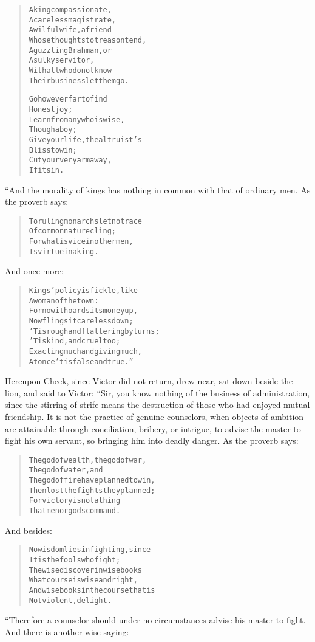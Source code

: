 \documentclass[article, twoside, 14pt]{memoir}
\renewenvironment{verbatim}{%
\begin{quote}%
\vskip -10pt%
\begin{alltt}\normalfont\large}{\end{alltt}%
\end{quote}%
\vskip -10pt
} %
\begin{document}
\begin{verbatim}
A king compassionate,
A careless magistrate,
A wilful wife, a friend
Whose thoughts to treason tend,
A guzzling Brahman, or
A sulky servitor,
With all who do not know
Their business{\textemdash}let them go.

Go however far to find
    Honest joy;
Learn from any who is wise,
    Though a boy;
Give your life, the altruist's
    Bliss to win;
Cut your very arm away,
    If it sin.
\end{verbatim}
“And the morality of kings has nothing in common with that of
ordinary men. As the proverb says:

\begin{verbatim}
To ruling monarchs let no trace
    Of common nature cling;
For what is vice in other men,
    Is virtue in a king.
\end{verbatim}
And once more:

\begin{verbatim}
Kings' policy is fickle, like
    A woman of the town:
For now it hoards its money up,
    Now flings it careless down;
'Tis rough and flattering by turns;
    'Tis kind, and cruel too;
Exacting much and giving much,
    At once 'tis false and true.”
\end{verbatim}
Hereupon Cheek, since Victor did not return, drew near, sat down
beside the lion, and said to Victor: “Sir, you know nothing of the
business of administration, since the stirring of strife means the
destruction of those who had enjoyed mutual friendship. It is not
the practice of genuine counselors, when objects of ambition are
attainable through conciliation, bribery, or intrigue, to advise
the master to fight his own servant, so bringing him into deadly
danger. As the proverb says:

\begin{verbatim}
The god of wealth, the god of war,
    The god of water, and
The god of fire have planned to win,
    Then lost the fights they planned;
For victory is not a thing
    That men or gods command.
\end{verbatim}
And besides:

\begin{verbatim}
No wisdom lies in fighting, since
    It is the fools who fight;
The wise discover in wise books
    What course is wise and right,
And wise books in the course that is
    Not violent, delight.
\end{verbatim}
“Therefore a counselor should under no circumstances advise his
master to fight. And there is another wise saying:
\end{document}
